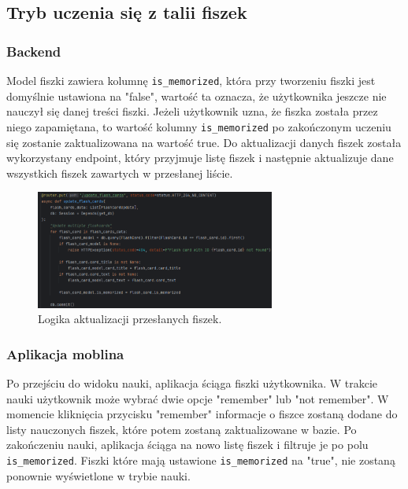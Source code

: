 \subsection{Tryb uczenia się z talii fiszek}

\subsubsection{Backend}

Model fiszki zawiera kolumnę \texttt{is\_memorized}, która przy tworzeniu fiszki jest domyślnie ustawiona na "false", wartość ta oznacza, że użytkownika jeszcze nie nauczył się danej treści fiszki. Jeżeli użytkownik uzna, że fiszka została przez niego zapamiętana, to wartość kolumny \texttt{is\_memorized} po zakończonym uczeniu się zostanie zaktualizowana na wartość true. Do aktualizacji danych fiszek została wykorzystany endpoint, który przyjmuje listę fiszek i następnie aktualizuje dane wszystkich fiszek zawartych w przesłanej liście.

\begin{figure}[H]
    \centering
    \includegraphics[width=0.7\textwidth]{chapters/chapter_8/screens/update_flash_card_memorized_backend}
    \caption{Logika aktualizacji przesłanych fiszek.}
    \label{img:update_flash_card_memorized_backend}
\end{figure}

\subsubsection{Aplikacja moblina}

Po przejściu do widoku nauki, aplikacja ściąga fiszki użytkownika. W trakcie nauki użytkownik może wybrać dwie opcje "remember" lub "not remember". W momencie kliknięcia przycisku "remember" informacje o fiszce zostaną dodane do listy nauczonych fiszek, które potem zostaną zaktualizowane w bazie. Po zakończeniu nauki, aplikacja ściąga na nowo listę fiszek i filtruje je po polu \texttt{is\_memorized}. Fiszki które mają ustawione \texttt{is\_memorized} na "true", nie zostaną ponownie wyświetlone w trybie nauki.

